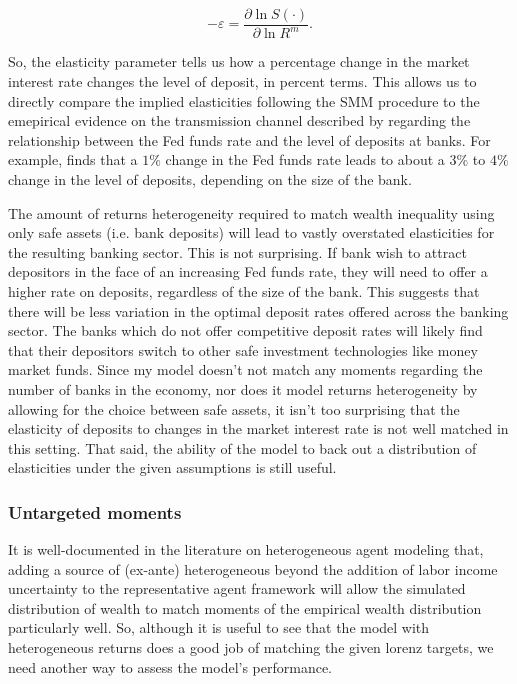 \[
-\varepsilon = \frac{\partial \ln S(\cdot)}{\partial \ln R^m}. 
\]

\par So, the elasticity parameter tells us how a percentage change in the market interest rate changes the level of deposit, in percent terms. This allows us to directly compare the implied elasticities following the SMM procedure to the emepirical evidence on the transmission channel described by \cite{Drechsler2017} regarding the relationship between the Fed funds rate and the level of deposits at banks. For example, \cite{Genay2004} finds that a $1\%$ change in the Fed funds rate leads to about a  $3\%$ to  $4\%$ change in the level of deposits, depending on the size of the bank.

\par The amount of returns heterogeneity required to match wealth inequality using only safe assets (i.e. bank deposits) will lead to vastly overstated elasticities for the resulting banking sector. This is not surprising. If bank wish to attract depositors in the face of an increasing Fed funds rate, they will need to offer a higher rate on deposits, regardless of the size of the bank. This suggests that there will be less variation in the optimal deposit rates offered across the banking sector. The banks which do not offer competitive deposit rates will likely find that their depositors switch to other safe investment technologies like money market funds. Since my model doesn't not match any moments regarding the number of banks in the economy, nor does it model returns heterogeneity by allowing for the choice between safe assets, it isn't too surprising that the elasticity of deposits to changes in the market interest rate is not well matched in this setting. That said, the ability of the model to back out a distribution of elasticities under the given assumptions is still useful. 

\subsubsection{Untargeted moments}

\par It is well-documented in the literature on heterogeneous agent modeling that, adding a source of (ex-ante) heterogeneous beyond the addition of labor income uncertainty to the representative agent framework will allow the simulated distribution of wealth to match moments of the empirical wealth distribution particularly well. So, although it is useful to see that the model with heterogeneous returns does a good job of matching the given lorenz targets, we need another way to assess the model's performance.

